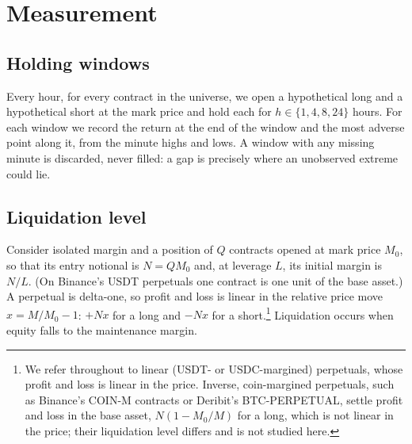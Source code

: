 \section{Measurement}
\label{sec:measure}

\subsection{Holding windows}

Every hour, for every contract in the universe, we open a hypothetical long and a hypothetical short
at the mark price and hold each for $h\in\{1,4,8,24\}$ hours. For each window we record the return at
the end of the window and the most adverse point along it, from the minute highs and lows. A window
with any missing minute is discarded, never filled: a gap is precisely where an unobserved extreme
could lie.

\subsection{Liquidation level}
\label{sec:liq}

Consider isolated margin and a position of $Q$ contracts opened at mark price $M_0$, so that its
entry notional is $N=QM_0$ and, at leverage $L$, its initial margin is $N/L$. (On Binance's USDT
perpetuals one contract is one unit of the base asset.) A perpetual is delta-one, so profit and loss
is linear in the relative price move $x=M/M_0-1$: $+Nx$ for a long and $-Nx$ for a short.\footnote{We
refer throughout to linear (USDT- or USDC-margined) perpetuals, whose profit and loss is linear in the
price. Inverse, coin-margined perpetuals, such as Binance's COIN-M contracts or Deribit's
BTC-PERPETUAL, settle profit and loss in the base asset, $N(1-M_0/M)$ for a long, which is not linear
in the price; their liquidation level differs and is not studied here.} Liquidation occurs when
equity falls to the maintenance margin.

